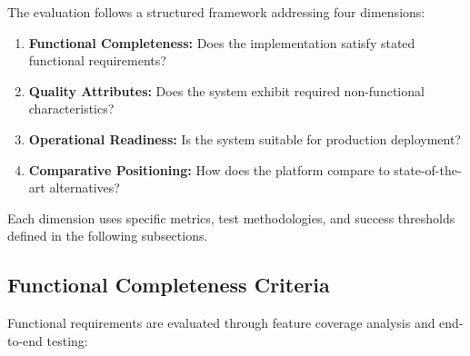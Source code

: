 \documentclass[a4paper,twoside]{sapthesis}
\begin{document}
The evaluation follows a structured framework addressing four dimensions:

\begin{enumerate}
    \item \textbf{Functional Completeness:} Does the implementation satisfy stated functional requirements?
    \item \textbf{Quality Attributes:} Does the system exhibit required non-functional characteristics?
    \item \textbf{Operational Readiness:} Is the system suitable for production deployment?
    \item \textbf{Comparative Positioning:} How does the platform compare to state-of-the-art alternatives?
\end{enumerate}

Each dimension uses specific metrics, test methodologies, and success thresholds defined in the following subsections.

\subsection{Functional Completeness Criteria}
\label{subsec:functional-criteria}

Functional requirements are evaluated through feature coverage analysis and end-to-end testing:
\end{document}
